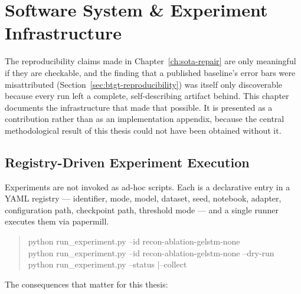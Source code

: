 \chapter{Software System \& Experiment Infrastructure}
\label{ch:software}

The reproducibility claims made in Chapter~\ref{ch:sota-repair} are only meaningful if they
are checkable, and the finding that a published baseline's error bars were misattributed
(Section~\ref{sec:btgt-reproducibility}) was itself only discoverable because every run left
a complete, self-describing artifact behind. This chapter documents the infrastructure that
made that possible. It is presented as a contribution rather than as an implementation
appendix, because the central methodological result of this thesis could not have been
obtained without it.

\section{Registry-Driven Experiment Execution}
\label{sec:runner}

Experiments are not invoked as ad-hoc scripts. Each is a declarative entry in a YAML
registry --- identifier, mode, model, dataset, seed, notebook, adapter, configuration path,
checkpoint path, threshold mode --- and a single runner executes them via papermill.

\begin{quote}\small\ttfamily
python run\_experiment.py --id recon-ablation-gelstm-none \\
python run\_experiment.py --id recon-ablation-gelstm-none --dry-run \\
python run\_experiment.py --status \quad|\quad --collect
\end{quote}

The consequences that matter for this thesis:

